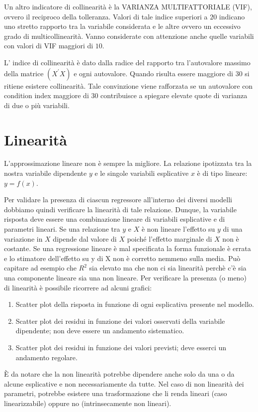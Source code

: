 \documentclass[a4page, 11pt]{article}
\begin{document}
Un altro indicatore di collinearità è la VARIANZA MULTIFATTORIALE (VIF), ovvero il reciproco della tolleranza. 
Valori di tale indice superiori a $20$ indicano uno stretto rapporto tra la variabile considerata e le altre ovvero un eccessivo grado di multicollinearità. Vanno considerate con attenzione anche quelle variabili con valori di VIF maggiori di $10$.

L’ indice di collinearità è dato dalla radice del rapporto tra l’autovalore massimo della matrice $(X^{\prime}X)$ e ogni autovalore. Quando risulta essere maggiore di $30$ si ritiene esistere collinearità. Tale convinzione viene rafforzata se un autovalore con condition index maggiore di $30$ contribuisce a spiegare elevate quote di varianza di due o più variabili.

\section{Linearità}

L'approssimazione lineare non è sempre la migliore. La relazione ipotizzata tra la nostra variabile dipendente $y$ e le singole variabili esplicative $x$ è di tipo lineare: $y = f (x)$. %

Per validare la presenza di ciascun regressore all’interno dei diversi modelli dobbiamo quindi verificare la linearità di tale relazione.
Dunque, la variabile risposta deve essere una combinazione lineare di variabili esplicative e di parametri lineari.
Se una relazione tra $y$ e $X$ è non lineare l’effetto su $y$ di una variazione in $X$ dipende dal valore di $X$ poiché l’effetto marginale di $X$ non è costante. %
Se una regressione lineare è mal specificata la forma funzionale è
errata e lo stimatore dell’effetto su y di X non è corretto nemmeno sulla media. %
Può capitare ad esempio che $R^{2}$ sia elevato ma che non ci sia linearità perchè c'è sia una componente lineare sia una non lineare. 
Per verificare la presenza (o meno) di linearità è possibile ricorrere ad alcuni grafici: 
\begin{enumerate}[noitemsep]
\item Scatter plot della risposta in funzione di ogni esplicativa presente nel modello.
\item Scatter plot dei residui in funzione dei valori osservati della variabile dipendente; non deve essere un andamento sistematico.
\item Scatter plot dei residui in funzione dei valori previsti; deve esserci un andamento regolare.
\end{enumerate}
È da notare che la non linearità potrebbe dipendere anche solo da una o da alcune esplicative e non necessariamente da tutte.
Nel caso di non linearità dei parametri, potrebbe esistere una trasformazione che li renda lineari (caso linearizzabile) oppure no (intrinsecamente non lineari).
\end{document}
